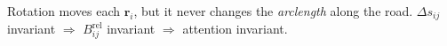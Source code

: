 \documentclass[preview]{standalone}
\begin{document}
\begin{center}
Rotation moves each $\mathbf{r}_i$, but it never changes the \emph{arclength} along the road.  $\Delta s_{ij}$ invariant $\Rightarrow$ $B^{\mathrm{rel}}_{ij}$ invariant $\Rightarrow$ attention invariant.
\end{center}
\end{document}
